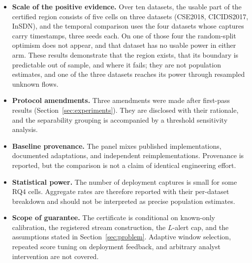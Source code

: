 \documentclass[a4paper,fleqn]{cas-dc}
\begin{document}
\begin{itemize}
  \item \textbf{Scale of the positive evidence.} Over ten datasets, the usable part of the certified region consists of five cells on three datasets (CSE2018, CICIDS2017, InSDN), and the temporal comparison uses the four datasets whose captures carry timestamps, three seeds each. On one of those four the random-split optimism does not appear, and that dataset has no usable power in either arm. These results demonstrate that the region exists, that its boundary is predictable out of sample, and where it fails; they are not population estimates, and one of the three datasets reaches its power through resampled unknown flows.
  \item \textbf{Protocol amendments.} Three amendments were made after first-pass results (Section~\ref{sec:experiments}). They are disclosed with their rationale, and the separability grouping is accompanied by a threshold sensitivity analysis.
  \item \textbf{Baseline provenance.} The panel mixes published implementations, documented adaptations, and independent reimplementations. Provenance is reported, but the comparison is not a claim of identical engineering effort.
  \item \textbf{Statistical power.} The number of deployment captures is small for some RQ4 cells. Aggregate rates are therefore reported with their per-dataset breakdown and should not be interpreted as precise population estimates.
  \item \textbf{Scope of guarantee.} The certificate is conditional on known-only calibration, the registered stream construction, the $L$-alert cap, and the assumptions stated in Section~\ref{sec:problem}. Adaptive window selection, repeated score tuning on deployment feedback, and arbitrary analyst intervention are not covered.
\end{itemize}
\end{document}
